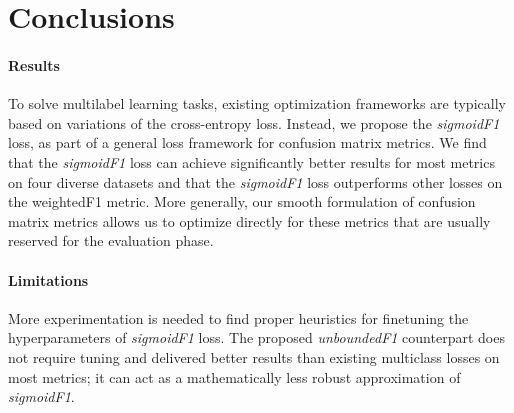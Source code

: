 
\section{Conclusions}
\label{sec:orged3d8a1}


\paragraph{Results}

To solve multilabel learning tasks, existing optimization frameworks are typically based on variations of the cross-entropy loss. Instead, we propose the \emph{sigmoidF1} loss, as part of a general loss framework for confusion matrix metrics. We find that the \emph{sigmoidF1} loss can achieve significantly better results for most metrics on four diverse datasets and that the \emph{sigmoidF1} loss outperforms other losses on the weightedF1 metric.
More generally, our smooth formulation of confusion matrix metrics allows us to optimize directly for these metrics that are usually reserved for the evaluation phase.

\paragraph{Limitations}
More experimentation is needed to find proper heuristics for finetuning the hyperparameters of \emph{sigmoidF1} loss. The proposed \emph{unboundedF1} counterpart does not require tuning and delivered better results than existing multiclass losses on most metrics; it can act as a mathematically less robust approximation of \emph{sigmoidF1}.

